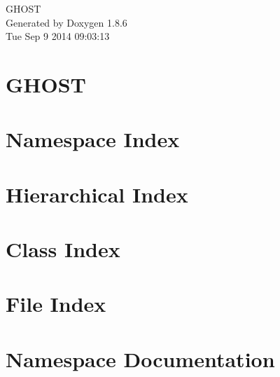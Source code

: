 \documentclass[twoside]{book}
\newcommand{\clearemptydoublepage}{%
  \newpage{\pagestyle{empty}\cleardoublepage}%
}
\begin{document}
\hypersetup{pageanchor=false}
\begin{titlepage}
\vspace*{7cm}
\begin{center}%
{\Large G\-H\-O\-S\-T }\\
\vspace*{1cm}
{\large Generated by Doxygen 1.8.6}\\
\vspace*{0.5cm}
{\small Tue Sep 9 2014 09:03:13}\\
\end{center}
\end{titlepage}
\clearemptydoublepage
\tableofcontents
\clearemptydoublepage
{}
\hypersetup{pageanchor=true}

\chapter{G\-H\-O\-S\-T}
\label{index}\hypertarget{index}{}
\chapter{Namespace Index}

\chapter{Hierarchical Index}

\chapter{Class Index}

\chapter{File Index}

\chapter{Namespace Documentation}

\end{document}
